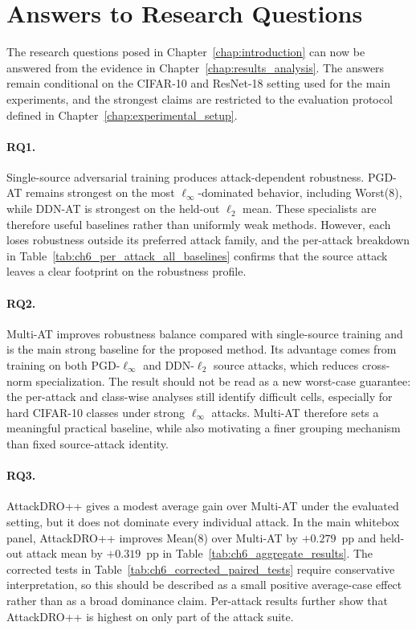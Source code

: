 \section{Answers to Research Questions}

The research questions posed in Chapter~\ref{chap:introduction} can now be
answered from the evidence in Chapter~\ref{chap:results_analysis}.  The answers
remain conditional on the CIFAR-10 and ResNet-18 setting used for the main
experiments, and the strongest claims are restricted to the evaluation protocol
defined in Chapter~\ref{chap:experimental_setup}.

\paragraph{RQ1.}
Single-source adversarial training produces attack-dependent robustness.
PGD-AT remains strongest on the most $\ell_\infty$-dominated behavior, including
Worst(8), while DDN-AT is strongest on the held-out $\ell_2$ mean.  These
specialists are therefore useful baselines rather than uniformly weak methods.
However, each loses robustness outside its preferred attack family, and the
per-attack breakdown in Table~\ref{tab:ch6_per_attack_all_baselines} confirms
that the source attack leaves a clear footprint on the robustness profile.

\paragraph{RQ2.}
Multi-AT improves robustness balance compared with single-source training and is
the main strong baseline for the proposed method.  Its advantage comes from
training on both PGD-$\ell_\infty$ and DDN-$\ell_2$ source attacks, which
reduces cross-norm specialization.  The result should not be read as a new
worst-case guarantee: the per-attack and class-wise analyses still identify
difficult cells, especially for hard CIFAR-10 classes under strong
$\ell_\infty$ attacks.  Multi-AT therefore sets a meaningful practical baseline,
while also motivating a finer grouping mechanism than fixed source-attack
identity.

\paragraph{RQ3.}
AttackDRO++ gives a modest average gain over Multi-AT under the evaluated
setting, but it does not dominate every individual attack.  In the main
whitebox panel, AttackDRO++ improves Mean(8) over Multi-AT by $+0.279$~pp and
held-out attack mean by $+0.319$~pp in
Table~\ref{tab:ch6_aggregate_results}.  The corrected tests in
Table~\ref{tab:ch6_corrected_paired_tests} require conservative interpretation,
so this should be described as a small positive average-case effect rather than
as a broad dominance claim.  Per-attack results further show that AttackDRO++ is
highest on only part of the attack suite.

